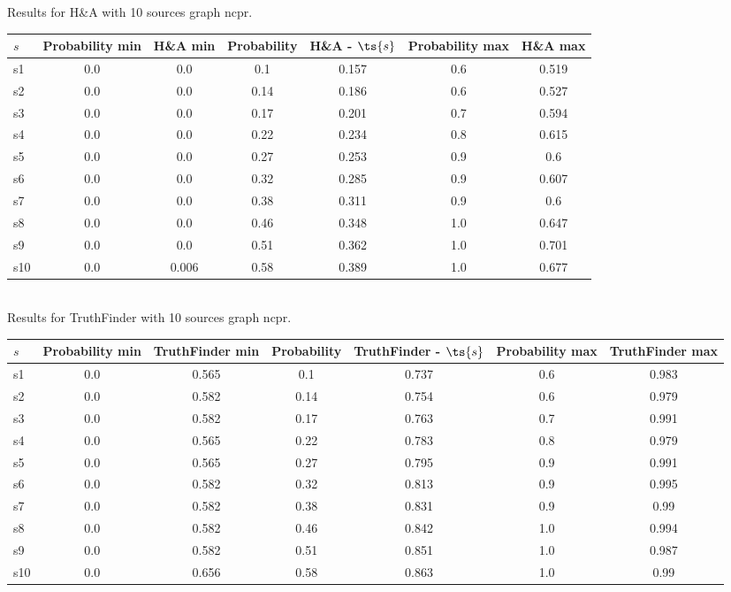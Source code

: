 \documentclass{article}
\begin{document}
\noindent Results for H\&A with 10 sources graph ncpr.

\noindent\begin{tabular}{|l|c|c|c|c|c|c|}
\hline
$s$& Probability min & H\&A min & Probability & H\&A - $\ts{s}$ & Probability max & H\&A max\\
\hline
s1 &0.0 & 0.0 & 0.1 & 0.157 & 0.6 & 0.519\\
\hline
s2 &0.0 & 0.0 & 0.14 & 0.186 & 0.6 & 0.527\\
\hline
s3 &0.0 & 0.0 & 0.17 & 0.201 & 0.7 & 0.594\\
\hline
s4 &0.0 & 0.0 & 0.22 & 0.234 & 0.8 & 0.615\\
\hline
s5 &0.0 & 0.0 & 0.27 & 0.253 & 0.9 & 0.6\\
\hline
s6 &0.0 & 0.0 & 0.32 & 0.285 & 0.9 & 0.607\\
\hline
s7 &0.0 & 0.0 & 0.38 & 0.311 & 0.9 & 0.6\\
\hline
s8 &0.0 & 0.0 & 0.46 & 0.348 & 1.0 & 0.647\\
\hline
s9 &0.0 & 0.0 & 0.51 & 0.362 & 1.0 & 0.701\\
\hline
s10 &0.0 & 0.006 & 0.58 & 0.389 & 1.0 & 0.677\\
\hline
\end{tabular}\\

\noindent Results for TruthFinder with 10 sources graph ncpr.

\noindent\begin{tabular}{|l|c|c|c|c|c|c|}
\hline
$s$& Probability min & TruthFinder min & Probability & TruthFinder - $\ts{s}$ & Probability max & TruthFinder max\\
\hline
s1 &0.0 & 0.565 & 0.1 & 0.737 & 0.6 & 0.983\\
\hline
s2 &0.0 & 0.582 & 0.14 & 0.754 & 0.6 & 0.979\\
\hline
s3 &0.0 & 0.582 & 0.17 & 0.763 & 0.7 & 0.991\\
\hline
s4 &0.0 & 0.565 & 0.22 & 0.783 & 0.8 & 0.979\\
\hline
s5 &0.0 & 0.565 & 0.27 & 0.795 & 0.9 & 0.991\\
\hline
s6 &0.0 & 0.582 & 0.32 & 0.813 & 0.9 & 0.995\\
\hline
s7 &0.0 & 0.582 & 0.38 & 0.831 & 0.9 & 0.99\\
\hline
s8 &0.0 & 0.582 & 0.46 & 0.842 & 1.0 & 0.994\\
\hline
s9 &0.0 & 0.582 & 0.51 & 0.851 & 1.0 & 0.987\\
\hline
s10 &0.0 & 0.656 & 0.58 & 0.863 & 1.0 & 0.99\\
\hline
\end{tabular}\\
\end{document}

